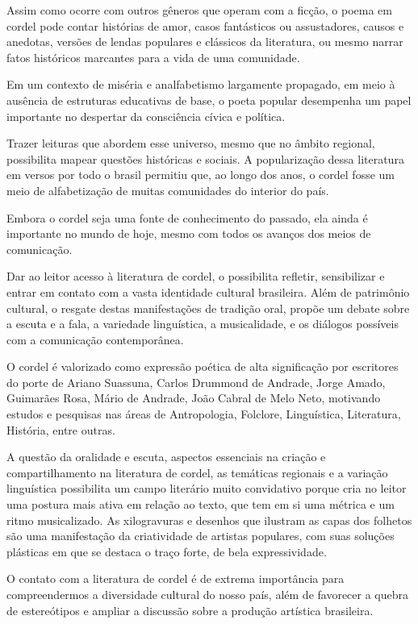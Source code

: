 \documentclass[12pt]{extarticle}
\begin{document}
Assim como ocorre com outros gêneros que operam com a ficção, o poema em
cordel pode contar histórias de amor, casos fantásticos ou assustadores,
causos e anedotas, versões de lendas populares e clássicos da
literatura, ou mesmo narrar fatos históricos marcantes para a vida de
uma comunidade.

Em um contexto de miséria e analfabetismo largamente propagado, em meio
à ausência de estruturas educativas de base, o poeta popular desempenha
um papel importante no despertar da consciência cívica e política.

Trazer leituras que abordem esse universo, mesmo que no âmbito regional,
possibilita mapear questões históricas e sociais. A popularização dessa
literatura em versos por todo o brasil permitiu que, ao longo dos anos,
o cordel fosse um meio de alfabetização de muitas comunidades do
interior do país.

Embora o cordel seja uma fonte de conhecimento do passado, ela ainda é
importante no mundo de hoje, mesmo com todos os avanços dos meios de
comunicação.

Dar ao leitor acesso à literatura de cordel, o possibilita refletir,
sensibilizar e entrar em contato com a vasta identidade cultural
brasileira. Além de patrimônio cultural, o resgate destas manifestações
de tradição oral, propõe um debate sobre a escuta e a fala, a variedade
linguística, a musicalidade, e os diálogos possíveis com a comunicação
contemporânea.

O cordel é valorizado como expressão poética de alta significação por
escritores do porte de Ariano Suassuna, Carlos Drummond de Andrade,
Jorge Amado, Guimarães Rosa, Mário de Andrade, João Cabral de Melo Neto,
motivando estudos e pesquisas nas áreas de Antropologia, Folclore,
Linguística, Literatura, História, entre outras.

A questão da oralidade e escuta, aspectos essenciais na criação e
compartilhamento na literatura de cordel, as temáticas regionais e a
variação linguística possibilita um campo literário muito convidativo
porque cria no leitor uma postura mais ativa em relação ao texto, que
tem em si uma métrica e um ritmo musicalizado. As xilogravuras e
desenhos que ilustram as capas dos folhetos são uma manifestação da
criatividade de artistas populares, com suas soluções plásticas em que
se destaca o traço forte, de bela expressividade.

O contato com a literatura de cordel é de extrema importância para
compreendermos a diversidade cultural do nosso país, além de favorecer a
quebra de estereótipos e ampliar a discussão sobre a produção artística
brasileira.
\end{document}
